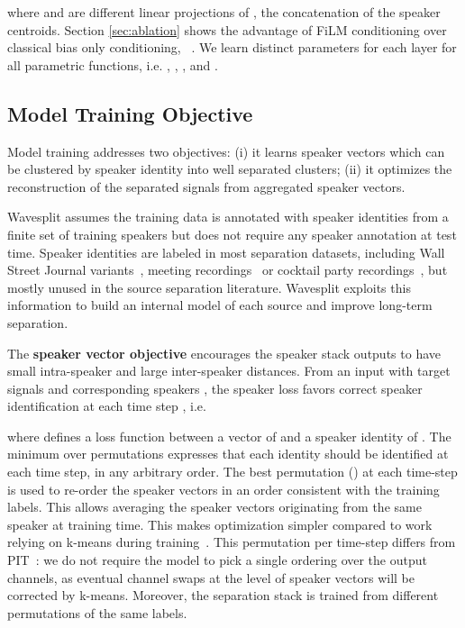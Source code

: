 \documentclass[letterpaper, onecolumn,10 pt]{IEEEtran}
\begin{document}
where  and  are different linear projections of , the concatenation of the speaker centroids. 
Section \ref{sec:ablation} shows the advantage of FiLM conditioning over classical bias only conditioning, ~\cite{oord:wavenet}.
We learn distinct parameters for each layer for all parametric functions, 
i.e. , , ,  and . 

\subsection{Model Training Objective}
\label{sec:objective}

Model training addresses two objectives: 
(i) it learns speaker vectors which can be clustered by speaker identity into well separated clusters;
(ii) it optimizes the reconstruction of the separated signals from aggregated speaker vectors.

Wavesplit assumes the training data is annotated with speaker identities from a finite set of  training speakers but does not require any speaker annotation at test time. Speaker identities are labeled in most separation datasets, including Wall Street Journal variants~\cite{hershey16:deep_clustering,wichern19:WHAM,maciejewski19:whamr}, meeting recordings~\cite{mccowan05:ami} or cocktail party recordings~\cite{barker18:chime5}, but mostly unused in the source separation literature. Wavesplit exploits this information to build an internal model of each source and improve long-term separation.

The {\bf speaker vector objective} encourages the speaker stack outputs to have small intra-speaker and large inter-speaker distances. 
From an input  with target signals  and corresponding speakers , 
the speaker loss favors correct speaker identification at each time step , i.e.

where  defines a loss function between a vector of 
and a speaker identity of . The minimum over permutations expresses that each identity should be identified at each time step, in any arbitrary order. 
The best permutation () at each time-step is used to re-order the speaker vectors in an order consistent with the training labels. This allows averaging the speaker vectors originating from the same speaker at training time. This makes optimization simpler compared to work relying on k-means during training~\cite{hershey17:deepunfold}. This permutation per time-step differs from PIT~\cite{xu18:pit}: we do not require the model to pick a single ordering over the output channels, as eventual channel swaps at the level of speaker vectors will be corrected by k-means. Moreover, the separation stack is trained from different permutations of the same labels.
\end{document}
